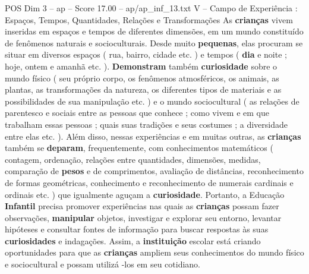 \begin{textsample}{POS Dim 3 – ap – Score 17.00 – ap/ap\_inf\_13.txt}  \label{ex:f3_pos_188}
V – Campo de Experiência : Espaços, Tempos, Quantidades, Relações e Transformações As \textbf{crianças} vivem inseridas em espaços e tempos de diferentes dimensões, em um mundo constituído de fenômenos naturais e socioculturais.
Desde muito \textbf{pequenas}, elas procuram se situar em diversos espaços ( rua, bairro, cidade etc. ) e tempos ( \textbf{dia} e noite ; hoje, ontem e amanhã etc. ). \textbf{Demonstram} também \textbf{curiosidade} sobre o mundo físico ( seu próprio corpo, os fenômenos atmosféricos, os animais, as plantas, as transformações da natureza, os diferentes tipos de materiais e as possibilidades de sua manipulação etc. ) e o mundo sociocultural ( as relações de parentesco e sociais entre as pessoas que conhece ; como vivem e em que trabalham essas pessoas ; quais suas tradições e seus costumes ; a diversidade entre elas etc. ).
Além disso, nessas experiências e em muitas outras, as \textbf{crianças} também se \textbf{deparam}, frequentemente, com conhecimentos matemáticos ( contagem, ordenação, relações entre quantidades, dimensões, medidas, comparação de \textbf{pesos} e de comprimentos, avaliação de distâncias, reconhecimento de formas geométricas, conhecimento e reconhecimento de numerais cardinais e ordinais etc. ) que igualmente aguçam a \textbf{curiosidade}.
Portanto, a Educação \textbf{Infantil} precisa promover experiências nas quais as \textbf{crianças} possam fazer observações, \textbf{manipular} objetos, investigar e explorar seu entorno, levantar hipóteses e consultar fontes de informação para buscar respostas às suas \textbf{curiosidades} e indagações.
Assim, a \textbf{instituição} escolar está criando oportunidades para que as \textbf{crianças} ampliem seus conhecimentos do mundo físico e sociocultural e possam utilizá -los em seu cotidiano.

\end{textsample}
